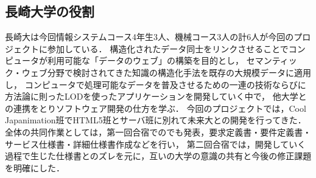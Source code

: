 \subsection{長崎大学の役割}
\par
長崎大は今回情報システムコース4年生3人、機械コース3人の計6人が今回のプロジェクトに参加している．
構造化されたデータ同士をリンクさせることでコンピュータが利用可能な「データのウェブ」の構築を目的とし，
セマンティック・ウェブ分野で検討されてきた知識の構造化手法を既存の大規模データに適用し，
コンピュータで処理可能なデータを普及させるための一連の技術ならびに方法論に則ったLODを使ったアプリケーションを開発していく中で，
他大学との連携をとりソフトウェア開発の仕方を学ぶ．
今回のプロジェクトでは，Cool Japanimation班でHTML5班とサーバ班に別れて未来大との開発を行ってきた．
全体の共同作業としては，第一回合宿でのでも発表，要求定義書・要件定義書・サービス仕様書・詳細仕様書作成などを行い，
第二回合宿では，開発していく過程で生じた仕様書とのズレを元に，互いの大学の意識の共有と今後の修正課題を明確にした．

